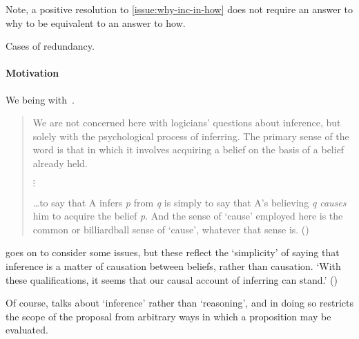 \begin{note}[Inclusion]
  Note, a positive resolution to \autoref{issue:why-inc-in-how} does not require an answer to why to be equivalent to an answer to how.

  Cases of redundancy.
\end{note}

\paragraph*{Motivation}

\begin{note}
  We being with~\cite{Armstrong:1968vh}.
  \begin{quote}
    We are not concerned here with logicians' questions about inference, but solely with the psychological process of inferring.
    The primary sense of the word is that in which it involves acquiring a belief on the basis of a belief already held.

    \mbox{}\hfill\(\vdots\)\hfill\mbox{}

    \dots to say that A infers \emph{p} from \emph{q} is simply to say that A's believing \emph{q} \emph{causes} him to acquire the belief \emph{p}.
    And the sense of `cause' employed here is the common or billiardball sense of `cause', whatever that sense is.%
    \mbox{}\hfill\mbox{(\citeyear[194]{Armstrong:1968vh})}
  \end{quote}
  \cite{Armstrong:1968vh} goes on to consider some issues, but these reflect the `simplicity' of saying that inference is a matter of causation between beliefs, rather than causation.
  `With these qualifications, it seems that our causal account of inferring can stand.'
  (\citeyear[197]{Armstrong:1968vh})

  Of course, \citeauthor{Armstrong:1968vh} talks about `inference' rather than `reasoning', and in doing so restricts the scope of the proposal from arbitrary ways in which a proposition may be evaluated.
\end{note}

